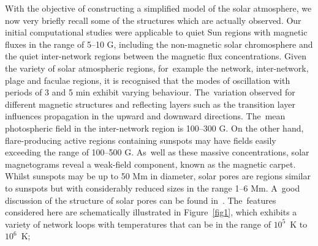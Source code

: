 \documentclass[physics,article,accept,pdftex,moreauthors]{Definitions/mdpi}
\begin{document}
%
With the objective of constructing a simplified model of the solar atmosphere, we now  very briefly recall some of the structures which are  actually observed. Our initial computational studies were applicable to 
 {quiet} 
Sun regions with magnetic fluxes in the range of 5--10 G, including the non-magnetic solar chromosphere and the quiet inter-network regions between the magnetic flux concentrations. Given the variety of solar atmospheric regions, for~example the network, inter-network, plage and faculae regions, it is recognised that the modes of oscillation with periods of 3 and 5 min exhibit varying behaviour. The~variation observed for different magnetic structures and reflecting layers such as the transition layer influences propagation in the upward and downward directions. The~mean photospheric field in the inter-network region is 100--300 G. 
 On the other hand, flare-producing 
 {active regions} %
containing sunspots may have fields easily  exceeding the %
range of 100--500 G. As~well as these massive concentrations, solar magnetograms reveal 
 a weak-field component, known as the magnetic carpet. Whilst sunspots may be up to 50 Mm in diameter, solar pores are regions similar to sunspots but with considerably reduced sizes in the range 1--6 Mm. A~good discussion of the structure of  solar pores can be found in~\cite{Simon1970,Cameron2007}. The~features considered here are  schematically illustrated in Figure~\ref{fig1}, which exhibits a  variety of network loops with temperatures  that  can be in the range of $10^{5}$~K to $10^{6}$~K; 
\end{document}
